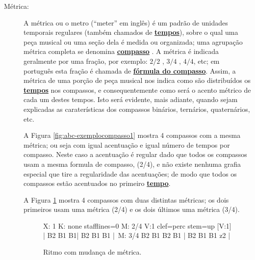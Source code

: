 \begin{description}
\item[Métrica:] \label{def:Metrica} 
A métrica ou o metro  (``meter'' em inglês) é
um padrão de unidades temporais regulares (também chamados de \hyperref[sec:Tempo]{\textbf{tempos}}), 
sobre o qual uma peça musical ou uma seção dela é medida ou organizada;
uma agrupação métrica completa se denomina \hyperref[def:Compasso]{\textbf{compasso}} \cite[pp. 947]{latham2008diccionario} \cite[pp. 523]{apel1969harvard}.
A métrica é indicada geralmente por uma fração, por exemplo:
${2}/{2}$ , ${3}/{4}$ , ${4}/{4}$, etc; 
em português esta fração é chamada de \hyperref[def:FormulaCompasso]{\textbf{fórmula do compasso}}.
Assim, a métrica de uma porção de peça musical nos indica como são distribuídos os 
\hyperref[sec:Tempo]{\textbf{tempos}} nos compassos,
e consequentemente como será o acento métrico de cada um destes tempos. 
Isto será evidente, mais adiante, 
quando sejam explicadas as caraterísticas dos compassos binários, ternários, quaternários, etc.
\begin{example}
A Figura \ref{fig:abc-exemplocompasso1} mostra 4 compassos com a mesma métrica;
ou seja com igual acentuação e igual número de tempos por compasso.
Neste caso a acentuação é regular dado que todos os compassos usam a mesma formula de compasso, (2/4), 
e não existe nenhuma grafia especial que tire a regularidade das acentuações;
de modo que todos os compassos estão acentuados no primeiro \hyperref[sec:Tempo]{\textbf{tempo}}.
\end{example}

\begin{example}
A Figura \ref{fig:abc-exemplometrica1} mostra 4 compassos com duas distintas métricas;
os dois primeiros usam uma métrica (2/4) e os dois últimos uma métrica (3/4).
\end{example}

\begin{figure}[h]
\centering
\begin{abc}[name=abc-exemplometrica1]
%
X: 1 %
K: none stafflines=0 %
M: 2/4
V:1 clef=perc stem=up %
%
[V:1] | B2 B1 B1| B2 B1 B1 |\
M: 3/4 
B2 B1 B2 B1 | B2 B1 B1 z2  |
%       
\end{abc}
\caption{Ritmo com mudança de métrica.}
\label{fig:abc-exemplometrica1}
\end{figure}


\end{description}
